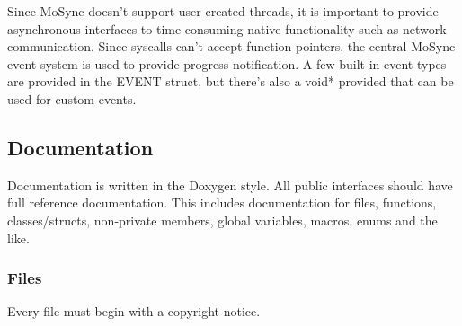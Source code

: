 \documentclass {article}
\begin{document}
Since MoSync doesn't support user-created threads, it is important to provide asynchronous interfaces to time-consuming native functionality such as network communication. Since syscalls can't accept function pointers, the central MoSync event system is used to provide progress notification. A few built-in event types are provided in the EVENT struct, but there's also a void* provided that can be used for custom events.


\subsection{Documentation}
Documentation is written in the Doxygen style. All public interfaces should have full reference documentation. This includes documentation for files, functions, classes/structs, non-private members, global variables, macros, enums and the like.

\subsubsection{Files}
Every file must begin with a copyright notice.
\end{document}
